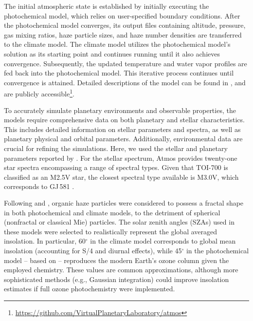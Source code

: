 The initial atmospheric state is established by initially executing the photochemical model, which relies on user-specified boundary conditions. After the photochemical model converges, its output files containing altitude, pressure, gas mixing ratios, haze particle sizes, and haze number densities are transferred to the climate model. The climate model utilizes the photochemical model’s solution as its starting point and continues running until it also achieves convergence. Subsequently, the updated temperature and water vapor profiles are fed back into the photochemical model. This iterative process continues until convergence is attained. Detailed descriptions of the model can be found in \cite{Arney.et.al.2016AsBio..16..873A}, and are publicly accessible\footnote{\url{https://github.com/VirtualPlanetaryLaboratory/atmos}}.

To accurately simulate planetary environments and observable properties, the models require comprehensive data on both planetary and stellar characteristics. This includes detailed information on stellar parameters and spectra, as well as planetary physical and orbital parameters. Additionally, environmental data are crucial for refining the simulations. 
Here, we used the  stellar and planetary parameters reported by \cite{Gilbert2020}. 
For the stellar spectrum, Atmos provides twenty-one star spectra encompassing a range of spectral types. Given that TOI-700 is classified as an M2.5V star, the closest spectral type available is M3.0V, which corresponds to GJ\,581 \citep{Turnbull.2015arXiv151001731T}. 

Following \cite{Arney.et.al.2016AsBio..16..873A} and \cite{Meadows.et.al.2018}, organic haze particles were considered to possess a fractal shape in both photochemical and climate models, to the detriment of spherical (nonfractal or classical Mie) particles. 
The solar zenith angles (SZAs) used in these models were selected to realistically represent the global averaged insolation. In particular, 60$^\circ$ in the climate model corresponds to global mean insolation (accounting for S/4 and diurnal effects), while 45$^\circ$ in the photochemical model -- based on \cite{Segura.et.al.2003AsBio...3..689S} -- reproduces the modern Earth's ozone column given the employed chemistry. These values are common approximations, although more sophisticated methods (e.g., Gaussian integration) could improve insolation estimates if full ozone photochemistry were implemented.

